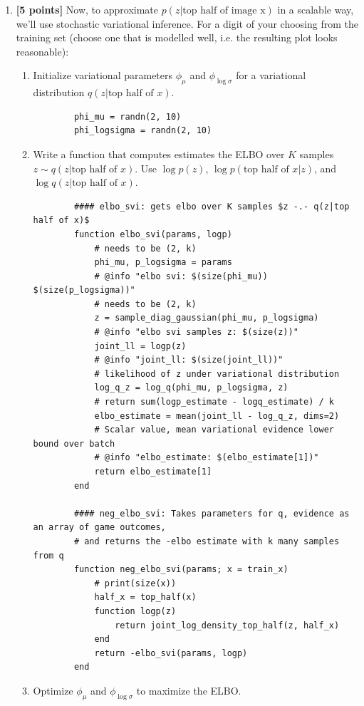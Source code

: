 \documentclass{article}
\begin{document}
\begin{enumerate}[label=(\alph*)]
	\item {\bf [5 points]} Now, to approximate $p(z | \text{top half of image x})$ in a scalable way, we'll use stochastic variational inference.  
    For a digit of your choosing from the training set (choose one that is modelled well, i.e. the resulting plot looks reasonable):

	\begin{enumerate}[label=(\alph*)]
		\item Initialize variational parameters $\phi_\mu$ and $\phi_{\log \sigma}$ for a variational distribution $q(z|\text{top half of $x$})$.
		
		\begin{lstlisting}
		phi_mu = randn(2, 10)
		phi_logsigma = randn(2, 10)
		\end{lstlisting}	
		
		\item Write a function that computes estimates the ELBO over $K$ samples $z \sim q(z|\text{top half of $x$})$.
		Use $\log p(z)$, $\log p(\text{top half of $x$} | z)$, and $\log q(z|\text{top half of $x$})$.
		
		\begin{lstlisting}
		#### elbo_svi: gets elbo over K samples $z -.- q(z|top half of x)$
		function elbo_svi(params, logp)
			# needs to be (2, k)
			phi_mu, p_logsigma = params
			# @info "elbo svi: $(size(phi_mu)) $(size(p_logsigma))"
			# needs to be (2, k)
			z = sample_diag_gaussian(phi_mu, p_logsigma)
			# @info "elbo svi samples z: $(size(z))"
			joint_ll = logp(z)
			# @info "joint_ll: $(size(joint_ll))"
			# likelihood of z under variational distribution 
			log_q_z = log_q(phi_mu, p_logsigma, z)
			# return sum(logp_estimate - logq_estimate) / k
			elbo_estimate = mean(joint_ll - log_q_z, dims=2)
			# Scalar value, mean variational evidence lower bound over batch
			# @info "elbo_estimate: $(elbo_estimate[1])"
			return elbo_estimate[1]
		end
		
		#### neg_elbo_svi: Takes parameters for q, evidence as an array of game outcomes,
		# and returns the -elbo estimate with k many samples from q
		function neg_elbo_svi(params; x = train_x) 
			# print(size(x))
			half_x = top_half(x)
			function logp(z)
				return joint_log_density_top_half(z, half_x)
			end
			return -elbo_svi(params, logp)
		end
		\end{lstlisting}	
		
		\item Optimize $\phi_\mu$ and $\phi_{\log \sigma}$ to maximize the ELBO.
		

\end{enumerate}
\end{enumerate}
\end{document}
